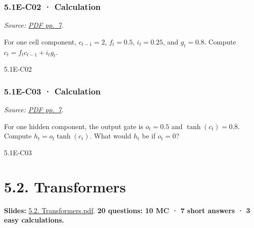 \noindent\begin{minipage}{\linewidth}

\subsubsection{5.1E-C02 · Calculation}\label{e-c02-calculation}

\emph{Source:
\href{../Lecture\%20Slides/5.1.\%20Extra\%20Material.pdf\#page=7}{PDF
pp.~7}.}

For one cell component, \(c_{t-1}=2\), \(f_t=0.5\), \(i_t=0.25\), and
\(g_t=0.8\). Compute \(c_t=f_tc_{t-1}+i_tg_t\).

\begin{solution}[26mm]{5.1E-C02}

\end{solution}
\end{minipage}\par\medskip

\noindent\begin{minipage}{\linewidth}

\subsubsection{5.1E-C03 · Calculation}\label{e-c03-calculation}

\emph{Source:
\href{../Lecture\%20Slides/5.1.\%20Extra\%20Material.pdf\#page=7}{PDF
pp.~7}.}

For one hidden component, the output gate is \(o_t=0.5\) and
\(\tanh(c_t)=0.8\). Compute \(h_t=o_t\tanh(c_t)\). What would \(h_t\) be
if \(o_t=0\)?

\begin{solution}[26mm]{5.1E-C03}

\end{solution}
\end{minipage}\par\medskip

\clearpage

\section{5.2. Transformers}\label{transformers}

\textbf{Slides:}
\href{../Lecture\%20Slides/5.2.\%20Transformers.pdf}{5.2.
Transformers.pdf}. \textbf{20 questions: 10 MC · 7 short answers · 3
easy calculations.}

